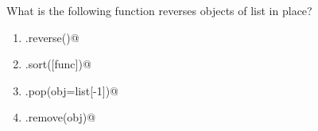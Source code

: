\question
What is the following function reverses objects of list in place?

\begin{enumerate}
\item \lstinline@list.reverse()@
\item \lstinline@list.sort([func])@
\item \lstinline@list.pop(obj=list[-1])@
\item \lstinline@list.remove(obj)@
\end{enumerate}

